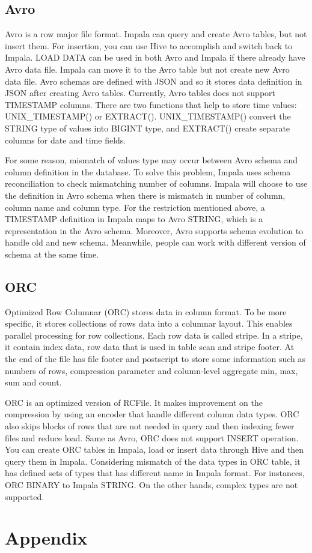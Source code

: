 \documentclass[onecolumn, draftclsnofoot,10pt, compsoc]{IEEEtran}
\begin{document}
        \subsection{Avro}
Avro is a row major file format.
Impala can query and create Avro tables, but not insert them. 
For insertion, you can use Hive to accomplish and switch back to Impala. 
LOAD DATA can be used in both Avro and Impala if there already have Avro data file. 
Impala can move it to the Avro table but not create new Avro data file. 
Avro schemas are defined with JSON and so it stores data definition in JSON after creating Avro tables.
Currently, Avro tables does not support TIMESTAMP columns.
There are two functions that help to store time values: UNIX\_TIMESTAMP() or EXTRACT().
UNIX\_TIMESTAMP() convert the STRING type of values into BIGINT type, and EXTRACT() create separate columns for date and time fields.

For some reason, mismatch of values type may occur between Avro schema and column definition in the database.
To solve this problem, Impala uses schema reconciliation to check mismatching number of columns. 
Impala will choose to use the definition in Avro schema when there is mismatch in number of column, column name and column type. 
For the restriction mentioned above, a TIMESTAMP definition in Impala maps to Avro STRING, which is a representation in the Avro schema.
Moreover, Avro supports schema evolution to handle old and new schema. 
Meanwhile, people can work with different version of schema at the same time.

        \subsection{ORC}
Optimized Row Columnar (ORC) stores data in column format.
To be more specific, it stores collections of rows data into a columnar layout.
This enables parallel processing for row collections. 
Each row data is called stripe. 
In a stripe, it contain index data, row data that is used in table scan and stripe footer. 
At the end of the file has file footer and postscript to store some information such as numbers of rows, compression parameter and column-level aggregate min, max, sum and count. 

ORC is an optimized version of RCFile.
It makes improvement on the compression by using an encoder that handle different column data types. 
ORC also skips blocks of rows that are not needed in query and then indexing fewer files and reduce load. 
Same as Avro, ORC does not support INSERT operation. 
You can create ORC tables in Impala, load or insert data through Hive and then query them in Impala.  
Considering mismatch of the data types in ORC table, it has defined sets of types that has different name in Impala format. 
For instances, ORC BINARY to Impala STRING. On the other hands, complex types are not supported. 



\section{Appendix}
	
\nocite{*}


    
\end{document}

